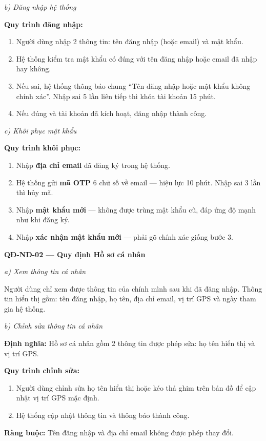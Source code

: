 ﻿\documentclass[12pt,a4paper]{article}
\begin{document}
\noindent\textit{b) Đăng nhập hệ thống}

\noindent\textbf{Quy trình đăng nhập:}
\begin{enumerate}
    \item Người dùng nhập 2 thông tin: tên đăng nhập (hoặc email) và mật khẩu.
    \item Hệ thống kiểm tra mật khẩu có đúng với tên đăng nhập hoặc email đã nhập hay không.
    \item Nếu sai, hệ thống thông báo chung ``Tên đăng nhập hoặc mật khẩu không chính xác''. Nhập sai 5 lần liên tiếp thì khóa tài khoản 15 phút.
    \item Nếu đúng và tài khoản đã kích hoạt, đăng nhập thành công.
\end{enumerate}

\noindent\textit{c) Khôi phục mật khẩu}

\noindent\textbf{Quy trình khôi phục:}
\begin{enumerate}
    \item Nhập \textbf{địa chỉ email} đã đăng ký trong hệ thống.
    \item Hệ thống gửi \textbf{mã OTP} 6 chữ số về email --- hiệu lực 10 phút. Nhập sai 3 lần thì hủy mã.
    \item Nhập \textbf{mật khẩu mới} --- không được trùng mật khẩu cũ, đáp ứng độ mạnh như khi đăng ký.
    \item Nhập \textbf{xác nhận mật khẩu mới} --- phải gõ chính xác giống bước 3.
\end{enumerate}

\vspace{0.3cm}
\noindent\textbf{QĐ-ND-02 --- Quy định Hồ sơ cá nhân}

\noindent\textit{a) Xem thông tin cá nhân}

Người dùng chỉ xem được thông tin của chính mình sau khi đã đăng nhập. Thông tin hiển thị gồm: tên đăng nhập, họ tên, địa chỉ email, vị trí GPS và ngày tham gia hệ thống.

\noindent\textit{b) Chỉnh sửa thông tin cá nhân}

\noindent\textbf{Định nghĩa:} Hồ sơ cá nhân gồm 2 thông tin được phép sửa: họ tên hiển thị và vị trí GPS.

\noindent\textbf{Quy trình chỉnh sửa:}
\begin{enumerate}
    \item Người dùng chỉnh sửa họ tên hiển thị hoặc kéo thả ghim trên bản đồ để cập nhật vị trí GPS mặc định.
    \item Hệ thống cập nhật thông tin và thông báo thành công.
\end{enumerate}
\noindent\textbf{Ràng buộc:} Tên đăng nhập và địa chỉ email không được phép thay đổi.
\end{document}
